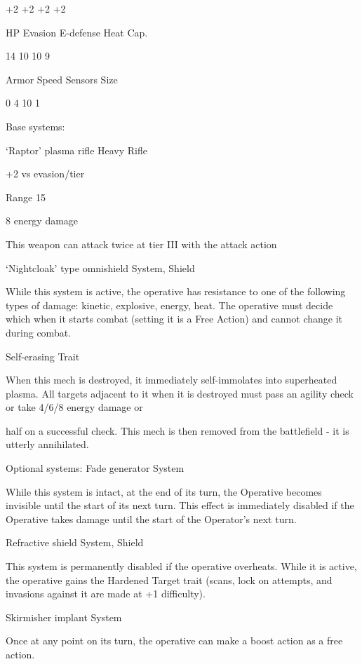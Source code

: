  +2         +2           +2            +2 

 HP         Evasion      E-defense     Heat Cap. 

 14         10           10            9 

 Armor      Speed        Sensors       Size 

 0          4            10            1 

Base systems:
 
‘Raptor’ plasma rifle  
Heavy Rifle
 
+2 vs evasion/tier
 
Range 15
 
8 energy damage
 
This weapon can attack twice at tier III with the attack action
 

‘Nightcloak’ type omnishield  
System, Shield
 
While this system is active, the operative has resistance to one of the following types of damage:  
kinetic, explosive, energy, heat. The operative must decide which when it starts combat (setting it  
is a Free Action) and cannot change it during combat.
 

Self-erasing  
Trait
 
When this mech is destroyed, it immediately self-immolates into superheated plasma. All targets  
adjacent to it when it is destroyed must pass an agility check or take 4/6/8 energy damage or  

                                                                                                           


half on a successful check. This mech is then removed from the battlefield - it is utterly  
annihilated.
 

Optional systems:  
Fade generator  
System
 
While this system is intact, at the end of its turn, the Operative becomes invisible until the start of  
its next turn. This effect is immediately disabled if the Operative takes damage until the start of  
the Operator’s next turn.
 

Refractive shield  
System, Shield
 
This system is permanently disabled if the operative overheats. While it is active, the operative  
gains the Hardened Target trait (scans, lock on attempts, and invasions against it are made at +1  
difficulty).
 

Skirmisher implant  
System
 
Once at any point on its turn, the operative can make a boost action as a free action.
 

